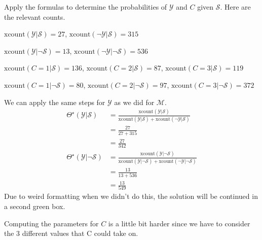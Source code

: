 \documentclass[review_Solutions]{subfiles}
\begin{document}
\begin{exercise}
Apply the formulas to determine the probabilities of $\mathcal{Y}$ and $C$ given $\mathcal{S}$.  Here are the relevant counts.

\bi
\item $\mbox{xcount}(\mathcal{Y}|  \mathcal{S}) = 27$,  $\mbox{xcount}(\neg \mathcal{Y}|  \mathcal{S}) = 315$
\item $\mbox{xcount}(\mathcal{Y}| \neg \mathcal{S}) = 13$,  $\mbox{xcount}(\neg \mathcal{Y}| \neg \mathcal{S}) = 536$
\item $\mbox{xcount}(C=1 | \mathcal{S}) = 136$, $\mbox{xcount}(C=2 | \mathcal{S}) = 87$, $\mbox{xcount}(C=3 | \mathcal{S}) = 119$
\item $\mbox{xcount}(C=1 | \neg \mathcal{S}) = 80$, $\mbox{xcount}(C=2 | \neg \mathcal{S}) = 97$, $\mbox{xcount}(C=3 | \neg \mathcal{S}) = 372$
\ei
\begin{boxedsolution}
We can apply the same steps for $\mathcal{Y}$ as we did for $\mathcal{M}$.
\begin{align}
\Theta^\star(\mathcal{Y}| \mathcal{S}) &= \frac{\mbox{xcount}(\mathcal{Y}| \mathcal{S})}{\mbox{xcount}(\mathcal{Y}| \mathcal{S}) + \mbox{xcount}(\neg \mathcal{Y}|  \mathcal{S}) } \nonumber \\
&= \frac{27}{27+315} \nonumber \\
&= \frac{27}{342} \nonumber \\
\Theta^\star(\mathcal{Y}| \neg \mathcal{S}) &= \frac{\mbox{xcount}(\mathcal{Y}| \neg \mathcal{S})}{\mbox{xcount}(\mathcal{Y}| \neg\mathcal{S}) + \mbox{xcount}(\neg \mathcal{Y}| \neg \mathcal{S}) } \nonumber \\
&= \frac{13}{13+536} \nonumber \\
&= \frac{13}{549}
\end{align}
Due to weird formatting when we didn't do this, the solution will be continued in a second green box.
\end{boxedsolution}

\begin{boxedsolution}
Computing the parameters for $C$ is a little bit harder since we have to consider the 3 different values that C could take on.


\end{boxedsolution}
\end{exercise}
\end{document}
